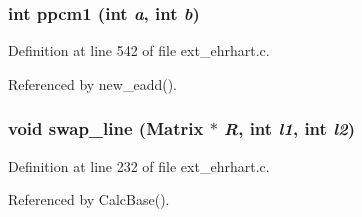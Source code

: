 \subsubsection{\setlength{\rightskip}{0pt plus 5cm}int ppcm1 (int {\em a}, int {\em b})\hspace{0.3cm}{\tt  [static]}}\label{ext__ehrhart_8c_a2}




Definition at line 542 of file ext\_\-ehrhart.c.

Referenced by new\_\-eadd().

\subsubsection{\setlength{\rightskip}{0pt plus 5cm}void swap\_\-line (Matrix $\ast$ {\em R}, int {\em l1}, int {\em l2})\hspace{0.3cm}{\tt  [static]}}\label{ext__ehrhart_8c_a6}




Definition at line 232 of file ext\_\-ehrhart.c.

Referenced by Calc\-Base().

